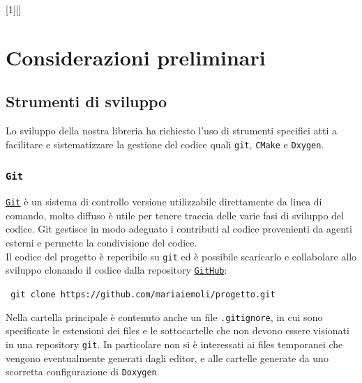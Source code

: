 [1][]{ }{}


\chapter{Considerazioni preliminari}

\section{Strumenti di sviluppo}
Lo sviluppo della nostra libreria ha richiesto l'uso di strumenti specifici atti a facilitare e sistematizzare la gestione del codice quali \texttt{git}, \texttt{CMake} e \texttt{Dxygen}.\\

\subsection{\texttt{Git}}
\href{https://github.com/}{\texttt{Git}} è un sistema di controllo versione utilizzabile direttamente da linea di comando, molto diffuso è utile per tenere traccia delle varie fasi di sviluppo del codice. Git gestisce in modo adeguato i contributi al codice provenienti da agenti esterni e permette la condivisione del codice.\\
Il codice del progetto è reperibile su \texttt{git} ed è possibile scaricarlo e collabolare allo sviluppo clonando il codice dalla repository  \href{https://github.com/}{\texttt{GitHub}}:\\
\begin{center}
\texttt{ git clone https://github.com/mariaiemoli/progetto.git}
\end{center}
Nella cartella principale è contenuto anche un file \texttt{.gitignore}, in cui sono specificate le estensioni dei files e le sottocartelle che non devono essere visionati in una repository \texttt{git}. In particolare non si è interessati ai files temporanei che vengono eventualmente generati dagli editor, e alle cartelle generate da uno scorretta configurazione di \texttt{Doxygen}.

